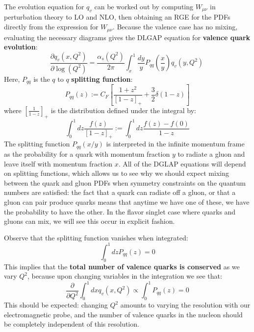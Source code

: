 \documentclass[11pt, oneside]{article}   	%
\theoremstyle{definition}
\begin{document}
The evolution equation for $q_v$ can be worked out by computing $W_{\mu\nu}$ in perturbation theory to LO and NLO, then obtaining an 
RGE for the PDFs directly from the expression for $W_{\mu\nu}$. Because the valence case has no mixing, evaluating the necessary 
diagrams gives the DLGAP equation for \textbf{valence quark evolution}:
\begin{equation}
	\frac{\partial q_v(x, Q^2)}{\partial\log(Q^2)} = \frac{\alpha_s(Q^2)}{2\pi}\int_x^1 \frac{dy}{y} P_{qq}\left(\frac{x}{y}\right) q_v(y, Q^2)~
	\label{eq:nonsinglet_evolution}
\end{equation}
Here, $P_{qq}$ is the $q$ to $q$ \textbf{splitting function}:
\begin{equation}
	P_{qq}(z) := C_F\left[\frac{1 + z^2}{[1 - z]_+} + \frac{3}{2}\delta(1 - z)\right]
\end{equation}
where $\left[\frac{1}{1 - z}\right]_+$ is the distribution defined under the integral by:
\begin{equation}
	\int_0^1 dz\frac{f(z)}{[1 - z]_+} := \int_0^1 dz\frac{f(z) - f(0)}{1 - z}
\end{equation}
The splitting function $P_{qq}(x / y)$ is interpreted in the infinite momentum frame as the probability for a quark with momentum fraction $y$ 
to radiate a gluon and leave itself with momentum fraction $x$. All of the DGLAP equations will depend on splitting functions, which allows 
us to see why we should expect mixing between the quark and gluon PDFs when symmetry constraints on the quantum numbers are 
satisfied: the fact that a quark can radiate off a gluon, or that a gluon can pair produce quarks means that anytime we have one of these, 
we have the probability to have the other. In the flavor singlet case where quarks and gluons can mix, we will see this occur in explicit 
fashion. 

Observe that the splitting function vanishes when integrated:
\begin{equation}
	\int_0^1 dz P_{qq}(z) = 0
\end{equation}
This implies that the \textbf{total number of valence quarks is conserved} as we vary $Q^2$, because upon changing variables in the 
integration we see that:
\begin{equation}
	\frac{\partial}{\partial Q^2}\int_0^1dx q_v(x, Q^2) \propto\int_0^1P_{qq}(z) = 0
\end{equation}
This should be expected: changing $Q^2$ amounts to varying the resolution with our electromagnetic probe, and the number of valence 
quarks in the nucleon should be completely independent of this resolution. 
\end{document}
